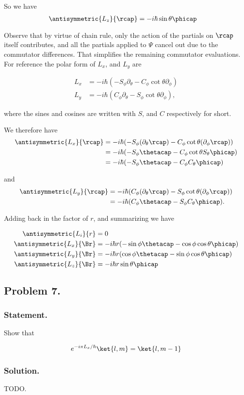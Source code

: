 So we have
\begin{align}\label{eqn:desaiCh4:610}
\antisymmetric{L_z}{\rcap}
&=
-i \hbar \sin\theta \phicap
\end{align}

Observe that by virtue of chain rule, only the action of the partials on $\rcap$ itself contributes, and all the partials applied to $\Psi$ cancel out due to the commutator differences.  That simplifies the remaining commutator evaluations.  For reference the polar form of $L_x$, and $L_y$ are

\begin{align}\label{eqn:desaiCh4:611}
L_x &= -i \hbar (-S_\phi \partial_\theta - C_\phi \cot\theta \partial_\phi) \\
L_y &= -i \hbar (C_\phi \partial_\theta - S_\phi \cot\theta \partial_\phi),
\end{align}

where the sines and cosines are written with $S$, and $C$ respectively for short.

We therefore have
\begin{align*}
\antisymmetric{L_x}{\rcap}
&= -i \hbar (-S_\phi (\partial_\theta \rcap) - C_\phi \cot\theta (\partial_\phi \rcap) ) \\
&= -i \hbar (-S_\phi \thetacap - C_\phi \cot\theta S_\theta \phicap ) \\
&= -i \hbar (-S_\phi \thetacap - C_\phi C_\theta \phicap ) \\
\end{align*}

and
\begin{align*}
\antisymmetric{L_y}{\rcap}
&= -i \hbar (C_\phi (\partial_\theta \rcap) - S_\phi \cot\theta (\partial_\phi \rcap)) \\
&= -i \hbar (C_\phi \thetacap - S_\phi C_\theta \phicap ).
\end{align*}

Adding back in the factor of $r$, and summarizing we have

\begin{align}\label{eqn:desaiCh4:620}
\antisymmetric{L_i}{r} &= 0 \\
\antisymmetric{L_x}{\Br} &= -i \hbar r (-\sin\phi \thetacap - \cos\phi \cos\theta \phicap ) \\
\antisymmetric{L_y}{\Br} &= -i \hbar r (\cos\phi \thetacap - \sin\phi \cos\theta \phicap ) \\
\antisymmetric{L_z}{\Br} &= -i \hbar r \sin\theta \phicap
\end{align}

\subsection{Problem 7.}
\subsubsection{Statement.}

Show that

\begin{align}\label{eqn:desaiCh4:700}
e^{-i\pi L_x /\hbar } \ket{l,m} = \ket{l,m-1}
\end{align}

\subsubsection{Solution.}

TODO.

\EndArticle
